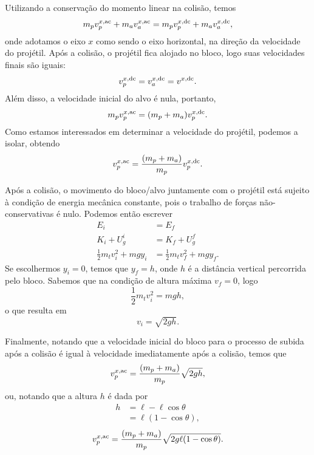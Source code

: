 Utilizando a conservação do momento linear na colisão, temos
\begin{equation}
    m_p v_p^{x, \rm{ac}} + m_a v_a^{x, \rm{ac}} = m_p v_p^{x, \rm{dc}} + m_a v_a^{x, \rm{dc}},
\end{equation}
%
onde adotamos o eixo $x$ como sendo o eixo horizontal, na direção da velocidade do projétil. Após a colisão, o projétil fica alojado no bloco, logo suas velocidades finais são iguais:
\begin{equation}
    v_p^{x, \rm{dc}} = v_a^{x, \rm{dc}} = v^{x, \rm{dc}}.
\end{equation}
%
Além disso, a velocidade inicial do alvo é nula, portanto,
\begin{equation}
    m_p v_p^{x, \rm{ac}} = (m_p + m_a) v_p^{x, \rm{dc}}.
\end{equation}
%
Como estamos interessados em determinar a velocidade do projétil, podemos a isolar, obtendo
\begin{equation}
    v_p^{x, \rm{ac}} = \frac{(m_p + m_a)}{m_p} v_p^{x, \rm{dc}}.
\end{equation}

Após a colisão, o movimento do bloco/alvo juntamente com o projétil está sujeito à condição de energia mecânica constante, pois o trabalho de forças não-conservativas é nulo. Podemos então escrever
\begin{align}
    E_i &= E_f \\
    K_i + U_g^i &= K_f + U_g^f \\
    \frac{1}{2} m_t v_i^2 + mgy_i &= \frac{1}{2} m_t v_f^2 + mgy_f.
\end{align}
%
Se escolhermos $y_i = 0$, temos que $y_f = h$, onde $h$ é a distância vertical percorrida pelo bloco. Sabemos que na condição de altura máxima $v_f = 0$, logo
\begin{equation}
    \frac{1}{2} m_t v_i^2 = mgh,
\end{equation}
%
o que resulta em
\begin{equation}
    v_i = \sqrt{2gh}.
\end{equation}

Finalmente, notando que a velocidade inicial do bloco para o processo de subida após a colisão é igual à velocidade imediatamente após a colisão, temos que
\begin{equation}
    v_p^{x, \rm{ac}} = \frac{(m_p + m_a)}{m_p} \sqrt{2gh},
\end{equation}
%
ou, notando que a altura $h$ é dada por
\begin{align}
    h &= \ell - \ell\cos\theta \\
    &= \ell (1 - \cos\theta),
\end{align}
%
\begin{equation}
    v_p^{x, \rm{ac}} = \frac{(m_p + m_a)}{m_p} \sqrt{2g\ell(1-\cos\theta)}.
\end{equation}

